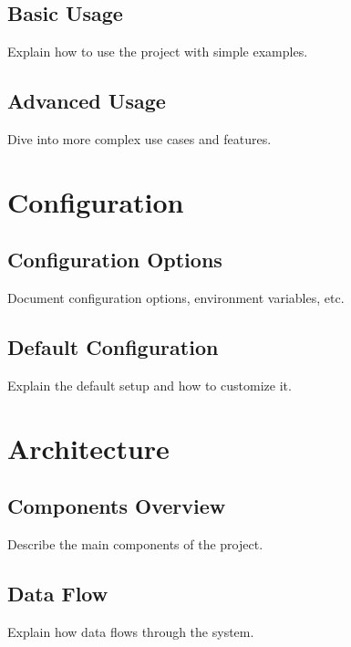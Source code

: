 \documentclass[letterpaper,10pt,english]{sphinxmanual}
\begin{document}
\section{Basic Usage}
\label{\detokenize{usage:basic-usage}}
\sphinxAtStartPar
Explain how to use the project with simple examples.


\section{Advanced Usage}
\label{\detokenize{usage:advanced-usage}}
\sphinxAtStartPar
Dive into more complex use cases and features.

\sphinxstepscope


\chapter{Configuration}
\label{\detokenize{configuration:configuration}}\label{\detokenize{configuration::doc}}

\section{Configuration Options}
\label{\detokenize{configuration:configuration-options}}
\sphinxAtStartPar
Document configuration options, environment variables, etc.


\section{Default Configuration}
\label{\detokenize{configuration:default-configuration}}
\sphinxAtStartPar
Explain the default setup and how to customize it.

\sphinxstepscope


\chapter{Architecture}
\label{\detokenize{architecture:architecture}}\label{\detokenize{architecture::doc}}

\section{Components Overview}
\label{\detokenize{architecture:components-overview}}
\sphinxAtStartPar
Describe the main components of the project.


\section{Data Flow}
\label{\detokenize{architecture:data-flow}}
\sphinxAtStartPar
Explain how data flows through the system.
\end{document}

